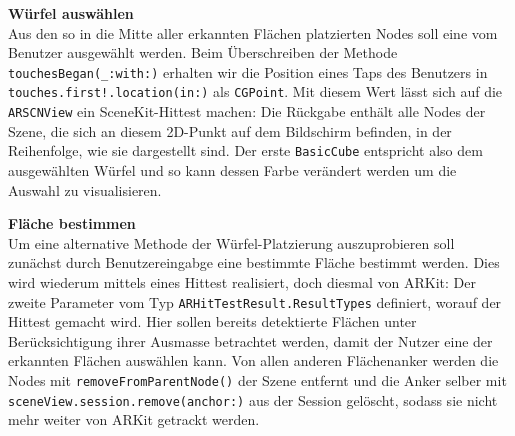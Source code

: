 \begin{description}
	\textbf{Würfel auswählen}\\
	Aus den so in die Mitte aller erkannten Flächen platzierten Nodes soll eine vom Benutzer ausgewählt werden. Beim Überschreiben der Methode \texttt{touchesBegan(\_:with:)} erhalten wir die Position eines Taps des Benutzers in \texttt{touches.first!.location(in:)} als \texttt{CGPoint}. Mit diesem Wert lässt sich auf die \texttt{ARSCNView} ein SceneKit-Hittest machen:
	Die Rückgabe enthält alle Nodes der Szene, die sich an diesem 2D-Punkt auf dem Bildschirm befinden, in der Reihenfolge, wie sie dargestellt sind. Der erste \texttt{BasicCube} entspricht also dem ausgewählten Würfel und so kann dessen Farbe verändert werden um die Auswahl zu visualisieren.

	\textbf{Fläche bestimmen}\\
	Um eine alternative Methode der Würfel-Platzierung auszuprobieren soll zunächst durch Benutzereingabge eine bestimmte Fläche bestimmt werden. Dies wird wiederum mittels eines Hittest realisiert, doch diesmal von ARKit:
	Der zweite Parameter vom Typ \texttt{ARHitTestResult.ResultTypes} definiert, worauf der Hittest gemacht wird. Hier sollen bereits detektierte Flächen unter Berücksichtigung ihrer Ausmasse betrachtet werden, damit der Nutzer eine der erkannten Flächen auswählen kann. Von allen anderen Flächenanker werden die Nodes mit \texttt{removeFromParentNode()} der Szene entfernt und die Anker selber mit \texttt{sceneView.session.remove(anchor:)} aus der Session gelöscht, sodass sie nicht mehr weiter von ARKit getrackt werden.


\end{description}
